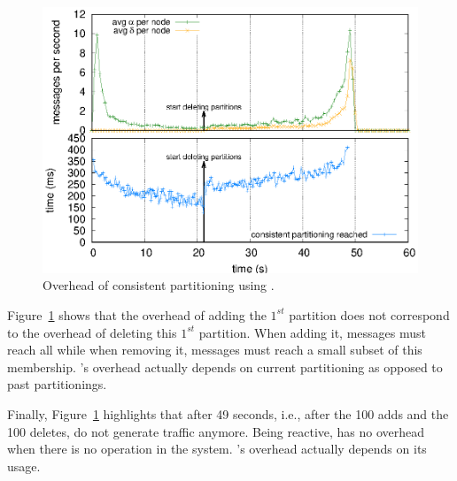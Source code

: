 \begin{asparadesc}
\begin{figure}
  \centering\includegraphics[width=0.99\columnwidth]{img/as_cast_complexity.eps}
  \caption{\label{fig:complexity}Overhead of consistent partitioning
    using \NAME.}
\end{figure}

\noindent Figure~\ref{fig:complexity} shows that the overhead of
adding the $1^{st}$ partition does not correspond to the overhead of
deleting this $1^{st}$ partition. When adding it, messages must reach
all \processes while when removing it, messages must reach a small
subset of this membership.  \NAME's overhead actually depends on
current partitioning as opposed to past partitionings.

\noindent Finally, Figure~\ref{fig:complexity} highlights that after
49 seconds, i.e., after the 100 adds and the 100 deletes, \processes
do not generate traffic anymore. Being reactive, \NAME has no overhead
when there is no operation in the system.  \NAME's overhead actually
depends on its usage.

\end{asparadesc}



